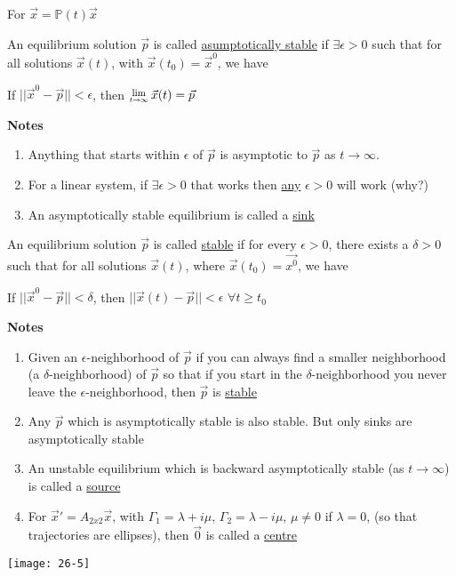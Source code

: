 For $\vec{x} = \mathbb{P}(t) \vec{x}$
\begin{definition}
	An equilibrium solution $\vec{p}$ is called \underline{asumptotically stable} if $\exists \epsilon > 0$ such that for all solutions $\vec{x}(t)$, with $\vec{x}(t_0) = \vec{x}^0$, we have
	\begin{center}
		If $|| \vec{x}^0 - \vec{p}|| < \epsilon$, then $\Lim{t \rightarrow \infty} \vec{x}(t) = \vec{p}$
	\end{center}
\end{definition}
\textbf{Notes}
\begin{enumerate}[label=\protect\circled{\arabic*}]
	\item Anything that starts within $\epsilon$ of $\vec{p}$ is asymptotic to $\vec{p}$ as $t \rightarrow \infty$.
	\item For a linear system, if $\exists\epsilon > 0$ that works then \underline{any} $\epsilon > 0$ will work (why?)
	\item An asymptotically stable equilibrium is called a \underline{sink}
\end{enumerate}
\begin{definition}
	An equilibrium solution $\vec{p}$ is called \underline{stable} if for every $\epsilon > 0$, there exists a $\delta > 0$ such that for all solutions $\vec{x}(t)$, where $\vec{x}(t_0) = \vec{x^0}$, we have
	\begin{center}
		If $|| \vec{x}^0 - \vec{p}|| < \delta$, then $||\vec{x}(t) - \vec{p}|| < \epsilon$ \qquad $\forall t \geq t_0$
	\end{center}
\end{definition}
\textbf{Notes} 
\begin{enumerate}[label=\protect\circled{\arabic*}]
	\item Given an $\epsilon$-neighborhood of $\vec{p}$ if you can always find a smaller neighborhood (a $\delta$-neighborhood) of $\vec{p}$ so that if you start in the $\delta$-neighborhood you never leave the $\epsilon$-neighborhood, then $\vec{p}$ is \underline{stable}
	\item Any $\vec{p}$ which is asymptotically stable is also stable. But only sinks are asymptotically stable
	\item An unstable equilibrium which is backward asymptotically stable (as $t \rightarrow \infty$) is called a \underline{source}
	\item For $\vec{x}' = A_{2x2} \vec{x}$, with $\Gamma_1 = \lambda + i \mu$, $\Gamma_2 = \lambda - i \mu$, $\mu \neq 0$ if $\lambda = 0$, (so that trajectories are ellipses), then $\vec{0}$ is called a \underline{centre}
\end{enumerate}
\begin{center}
	\texttt{[image: 26-5]}
\end{center}